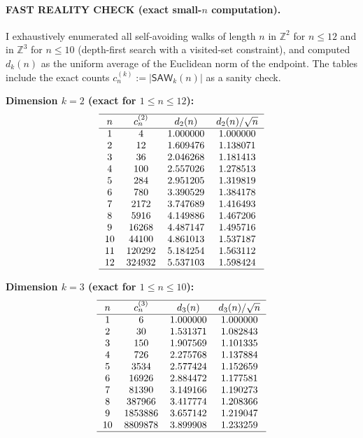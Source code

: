 \paragraph{FAST REALITY CHECK (exact small-$n$ computation).}
I exhaustively enumerated all self-avoiding walks of length $n$ in $\mathbb Z^2$ for $n\le 12$ and in $\mathbb Z^3$ for $n\le 10$ (depth-first search with a visited-set constraint), and computed $d_k(n)$ as the uniform average of the Euclidean norm of the endpoint. The tables include the exact counts $c_n^{(k)}:=|\mathsf{SAW}_k(n)|$ as a sanity check.

\medskip
\noindent\textbf{Dimension $k=2$ (exact for $1\le n\le 12$):}
\[
\begin{tabular}{cccc}
 \hline
$n$ & $c^{(2)}_n$ & $d_2(n)$ & $d_2(n)/\sqrt n$\\ \hline
1 & 4 & 1.000000 & 1.000000\\
2 & 12 & 1.609476 & 1.138071\\
3 & 36 & 2.046268 & 1.181413\\
4 & 100 & 2.557026 & 1.278513\\
5 & 284 & 2.951205 & 1.319819\\
6 & 780 & 3.390529 & 1.384178\\
7 & 2172 & 3.747689 & 1.416493\\
8 & 5916 & 4.149886 & 1.467206\\
9 & 16268 & 4.487147 & 1.495716\\
10 & 44100 & 4.861013 & 1.537187\\
11 & 120292 & 5.184254 & 1.563112\\
12 & 324932 & 5.537103 & 1.598424\\
\hline
\end{tabular}
\]

\medskip
\noindent\textbf{Dimension $k=3$ (exact for $1\le n\le 10$):}
\[
\begin{tabular}{cccc}
 \hline
$n$ & $c^{(3)}_n$ & $d_3(n)$ & $d_3(n)/\sqrt n$\\ \hline
1 & 6 & 1.000000 & 1.000000\\
2 & 30 & 1.531371 & 1.082843\\
3 & 150 & 1.907569 & 1.101335\\
4 & 726 & 2.275768 & 1.137884\\
5 & 3534 & 2.577424 & 1.152659\\
6 & 16926 & 2.884472 & 1.177581\\
7 & 81390 & 3.149166 & 1.190273\\
8 & 387966 & 3.417774 & 1.208366\\
9 & 1853886 & 3.657142 & 1.219047\\
10 & 8809878 & 3.899908 & 1.233259\\
\hline
\end{tabular}
\]

